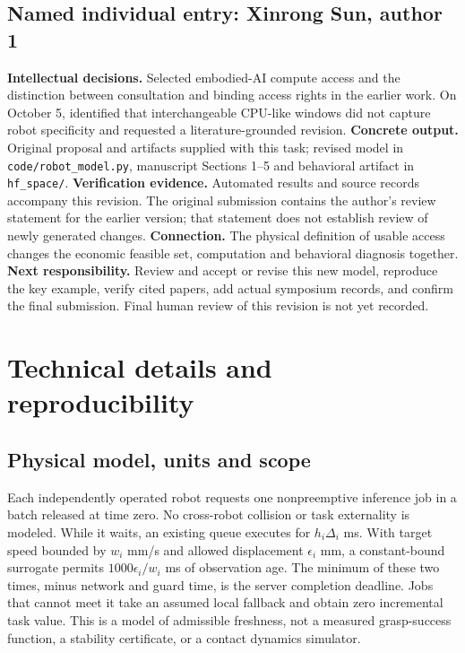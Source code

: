 \subsection*{Named individual entry: Xinrong Sun, author 1}
\textbf{Intellectual decisions.} Selected embodied-AI compute access and the distinction between consultation and binding access rights in the earlier work. On October 5, identified that interchangeable CPU-like windows did not capture robot specificity and requested a literature-grounded revision. \textbf{Concrete output.} Original proposal and artifacts supplied with this task; revised model in \texttt{code/robot\_model.py}, manuscript Sections 1--5 and behavioral artifact in \texttt{hf\_space/}. \textbf{Verification evidence.} Automated results and source records accompany this revision. The original submission contains the author's review statement for the earlier version; that statement does not establish review of newly generated changes. \textbf{Connection.} The physical definition of usable access changes the economic feasible set, computation and behavioral diagnosis together. \textbf{Next responsibility.} Review and accept or revise this new model, reproduce the key example, verify cited papers, add actual symposium records, and confirm the final submission. Final human review of this revision is not yet recorded.



\appendix
\section{Technical details and reproducibility}
\subsection{Physical model, units and scope}
Each independently operated robot requests one nonpreemptive inference job in a batch released at time zero. No cross-robot collision or task externality is modeled. While it waits, an existing queue executes for $h_i\Delta_i$ ms. With target speed bounded by $w_i$ mm/s and allowed displacement $\epsilon_i$ mm, a constant-bound surrogate permits $1000\epsilon_i/w_i$ ms of observation age. The minimum of these two times, minus network and guard time, is the server completion deadline. Jobs that cannot meet it take an assumed local fallback and obtain zero incremental task value. This is a model of admissible freshness, not a measured grasp-success function, a stability certificate, or a contact dynamics simulator.

